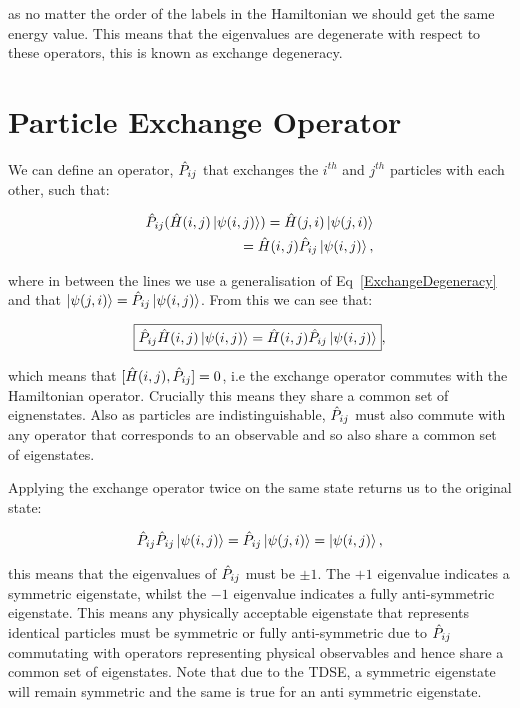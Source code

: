 \noindent as no matter the order of the labels in the Hamiltonian we should get the same energy value. This means that the eigenvalues are degenerate with respect to these operators, this is known as exchange degeneracy.

\section{Particle Exchange Operator}

We can define an operator, $\Hat{P}_{ij}$ that exchanges the $i^{th}$ and $j^{th}$ particles with each other, such that:

\begin{eqnarray}
    \Hat{P}_{ij} (\Hat{H}(i, j) \ket{\psi(i, j)}) = \Hat{H}(j, i) \ket{\psi(j, i)} \\
    \hspace{15mm} =\Hat{H}(i, j) \Hat{P}_{ij} \ket{\psi(i, j)},
\end{eqnarray}

\noindent where in between the lines we use a generalisation of Eq~\ref{ExchangeDegeneracy} and that $\ket{\psi(j, i)} = \Hat{P}_{ij} \ket{\psi(i, j)}$. From this we can see that:

\begin{equation}
    \boxed{\Hat{P}_{ij} \Hat{H}(i, j) \ket{\psi(i, j)} = \Hat{H}(i, j) \Hat{P}_{ij} \ket{\psi(i, j)}},
    \label{ExchangeOperatorCommutator}
\end{equation}

\noindent which means that $[\Hat{H}(i, j), \Hat{P}_{ij}] = 0$, i.e the exchange operator commutes with the Hamiltonian operator. Crucially this means they share a common set of eignenstates. Also as particles are indistinguishable, $\Hat{P}_{ij}$ must also commute with any operator that corresponds to an observable and so also share a common set of eigenstates.

\noindent Applying the exchange operator twice on the same state returns us to the original state:

\begin{equation}
    \Hat{P}_{ij} \Hat{P}_{ij} \ket{\psi(i, j)} = \Hat{P}_{ij} \ket{\psi(j, i)} = \ket{\psi(i, j)},
\end{equation}

\noindent this means that the eigenvalues of $\Hat{P}_{ij}$ must be $\pm1$. The $+1$ eigenvalue indicates a symmetric eigenstate, whilst the $-1$ eigenvalue indicates a fully anti-symmetric eigenstate. This means any physically acceptable eigenstate that represents identical particles must be symmetric or fully anti-symmetric due to $\Hat{P}_{ij}$ commutating with operators representing physical observables and hence share a common set of eigenstates. Note that due to the TDSE, a symmetric eigenstate will remain symmetric and the same is true for an anti symmetric eigenstate.


